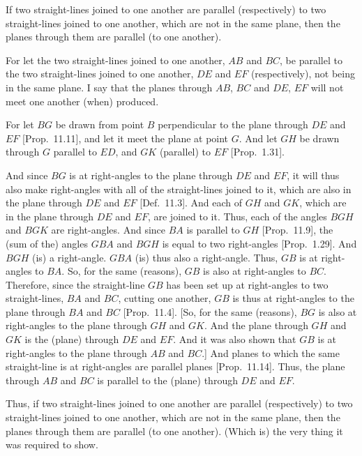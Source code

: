 \begin{Parallel}{}{}
{If two straight-lines joined to one another
are parallel (respectively) to two straight-lines joined to one another, which
are not in the same plane,
then the planes through them are parallel (to one another).

For let the two straight-lines joined to one another, $AB$ and $BC$, be parallel to the two straight-lines joined to one another, $DE$ and $EF$ (respectively), not being in the same plane. I say that the planes
through $AB$, $BC$ and $DE$, $EF$ will not meet one another (when) produced.

For let $BG$ be drawn from point $B$ perpendicular to the
plane through $DE$ and $EF$ [Prop.~11.11], and
let it meet the plane at point $G$. And let $GH$ be drawn through
$G$ parallel to $ED$, and $GK$ (parallel) to $EF$ [Prop.~1.31].

\epsfysize=2.2in
\centerline{}

And since $BG$ is at right-angles to the plane through $DE$ and $EF$,
it will thus also make right-angles with all of the straight-lines joined to it, which
are also in the plane through $DE$ and $EF$ [Def.~11.3]. And each of $GH$ and
$GK$, which are in the plane through $DE$ and $EF$,  are joined to it. 
Thus, each of the angles $BGH$ and $BGK$ are right-angles. And since
$BA$ is parallel to $GH$ [Prop.~11.9], the (sum of the) angles $GBA$ and $BGH$
is equal to two right-angles [Prop.~1.29]. 
And $BGH$ (is) a right-angle. $GBA$ (is) thus also a right-angle.
Thus, $GB$ is at right-angles to $BA$. So, for the same (reasons), $GB$
is also at right-angles to $BC$. Therefore, since the straight-line $GB$
has been set up at right-angles to two straight-lines, $BA$ and $BC$, cutting
one another, $GB$ is thus at right-angles to the plane through $BA$ and
$BC$ [Prop.~11.4]. [So, for the same (reasons), $BG$ is also at right-angles to the plane through $GH$ and $GK$. And the plane
through $GH$ and $GK$ is the (plane) through $DE$ and $EF$. And it was also shown that $GB$ is at right-angles to the plane through $AB$ and
$BC$.] And planes to which the same straight-line is at right-angles are
parallel planes [Prop.~11.14]. Thus, the plane
through $AB$ and $BC$ is parallel to the (plane) through $DE$ and $EF$.

Thus, if two straight-lines joined to one another
are parallel (respectively) to two straight-lines joined to one another, which
are not in the same plane,
then the planes through them are parallel (to one another). (Which is) the very thing it was required to show.}
\end{Parallel}

